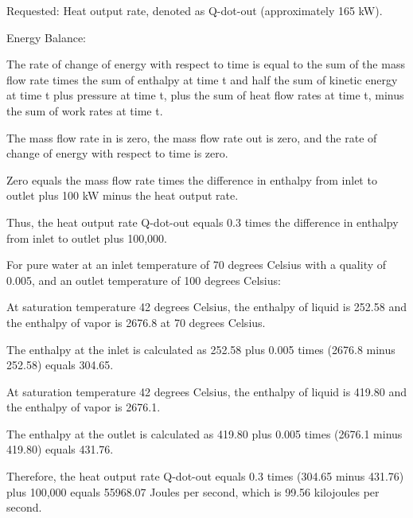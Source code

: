 Requested: Heat output rate, denoted as Q-dot-out (approximately 165 kW).

Energy Balance:

The rate of change of energy with respect to time is equal to the sum of the mass flow rate times the sum of enthalpy at time t and half the sum of kinetic energy at time t plus pressure at time t, plus the sum of heat flow rates at time t, minus the sum of work rates at time t.

The mass flow rate in is zero, the mass flow rate out is zero, and the rate of change of energy with respect to time is zero.

Zero equals the mass flow rate times the difference in enthalpy from inlet to outlet plus 100 kW minus the heat output rate.

Thus, the heat output rate Q-dot-out equals 0.3 times the difference in enthalpy from inlet to outlet plus 100,000.

For pure water at an inlet temperature of 70 degrees Celsius with a quality of 0.005, and an outlet temperature of 100 degrees Celsius:

At saturation temperature 42 degrees Celsius, the enthalpy of liquid is 252.58 and the enthalpy of vapor is 2676.8 at 70 degrees Celsius.

The enthalpy at the inlet is calculated as 252.58 plus 0.005 times (2676.8 minus 252.58) equals 304.65.

At saturation temperature 42 degrees Celsius, the enthalpy of liquid is 419.80 and the enthalpy of vapor is 2676.1.

The enthalpy at the outlet is calculated as 419.80 plus 0.005 times (2676.1 minus 419.80) equals 431.76.

Therefore, the heat output rate Q-dot-out equals 0.3 times (304.65 minus 431.76) plus 100,000 equals 55968.07 Joules per second, which is 99.56 kilojoules per second.
